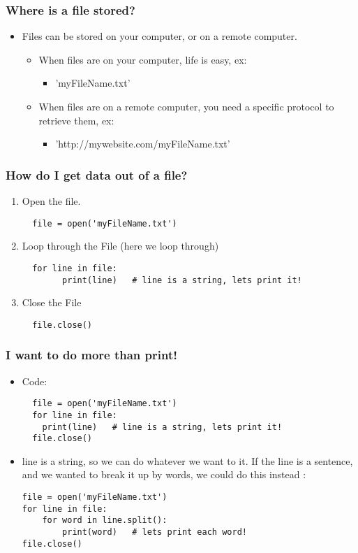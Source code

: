 \documentclass{beamer}
\begin{document}
\begin{frame}[fragile]
\frametitle{Where is a file stored?}
\begin{itemize}
\item Files can be stored on your computer, or on a remote computer.
\begin{itemize}
\item When files are on your computer, life is easy, ex:
\begin{itemize}
\item  'myFileName.txt'
\end{itemize}
\item When files are on a remote computer, you need a specific protocol to retrieve them, ex:
\begin{itemize}
\item 'http://mywebsite.com/myFileName.txt'
\end{itemize}
\end{itemize} 
\end{itemize}
\end{frame}

\begin{frame}[fragile]
\frametitle{How do I get data out of a file?}
\begin{enumerate}
\item Open the file.
  \begin{lstlisting}
  file = open('myFileName.txt')
  \end{lstlisting}
\item Loop through the File (here we loop through)
  \begin{lstlisting}
  for line in file:
        print(line)   # line is a string, lets print it!
  \end{lstlisting}
\item Close the File
  \begin{lstlisting}
  file.close()
  \end{lstlisting}
\end{enumerate}
\end{frame}

\begin{frame}[fragile]
\frametitle{I want to do more than print!}
\begin{itemize}
\item Code:
  \begin{lstlisting}
  file = open('myFileName.txt')
  for line in file:
    print(line)   # line is a string, lets print it!
  file.close()  
  \end{lstlisting}
\item line is a string, so we can do whatever we want to it.  If the line is a sentence, and we wanted to break it up by words, we could do this instead :
  \begin{lstlisting}
file = open('myFileName.txt')
for line in file:
    for word in line.split():
        print(word)   # lets print each word!
file.close()
  \end{lstlisting}
\end{itemize}
\end{frame}
\end{document}
